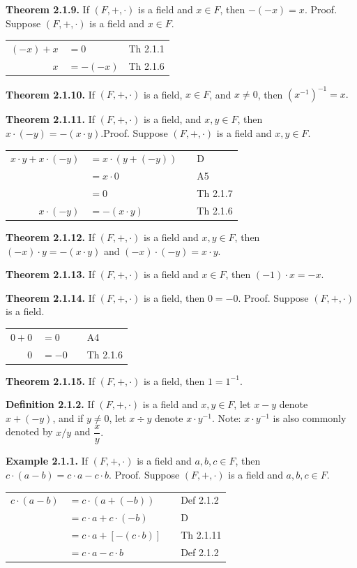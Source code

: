 \begin{large}
\textbf{Theorem 2.1.9.} If $(F,+,\cdot )$ is a field and $x \in F$, then $-(-x) = x$.\nl
 Proof. Suppose $(F,+,\cdot )$ is a field and $x \in F$.
\begin{tabular}{r l l}
$(-x) + x$& $= 0$ & Th 2.1.1 \\
$x$& $= -(-x)$ & Th 2.1.6 \\
\end{tabular} \nl

\textbf{Theorem 2.1.10.} If $(F,+,\cdot)$ is a field, $x \in F$, and $x \neq 0$, then $(x^{-1})^{-1} = x.$ \nl

\textbf{Theorem 2.1.11.} If $(F,+,\cdot )$ is a field, and $x,y \in F$, then $x\cdot (-y) = -(x\cdot y).$\nl Proof. Suppose $(F,+,\cdot )$ is a field and $x,y \in F.$\nl
\begin{tabular}{r l l l}
$x\cdot y + x\cdot (-y)$&$=x\cdot (y + (-y))$&&D \\
&$=x\cdot 0$ &&A5\\
&$=0$ &&Th 2.1.7 \\
$x\cdot (-y)$&$=-(x\cdot y)$ &&Th 2.1.6
\end{tabular}\nl


\textbf{Theorem 2.1.12.} If $(F,+,\cdot )$ is a field and $x,y \in F$, then $(-x)\cdot y = -(x\cdot y)$ and $(-x)\cdot (-y) = x\cdot y.$

\newpage

\textbf{Theorem 2.1.13.} If $(F,+,\cdot )$ is a field and $x \in F$, then $(-1)\cdot x = -x.$\nl

\textbf{Theorem 2.1.14.} If $(F,+,\cdot )$ is a field, then $0 = -0.$\nl
Proof. Suppose $(F,+,\cdot)$ is a field.

\begin{tabular}{r l l l}
$0 + 0$&$= 0$ &&A4\\
$0$ &$=-0$&& Th 2.1.6\\
\end{tabular}

\textbf{Theorem 2.1.15.} If $(F,+,\cdot)$ is a field, then $1 = 1^{-1}.$\nl

\textbf{Definition 2.1.2.} If $(F,+,\cdot )$ is a field and $x,y \in F$, let $x - y$ denote $x + (-y)$, and if $y \neq 0$, let $x\div y$ denote $x\cdot y^{-1}.$\nl
Note: $x\cdot y^{-1}$ is also commonly denoted by $x/y$ and $\dfrac{x}{y}.$\nl

\textbf{Example 2.1.1.} If $(F,+,\cdot)$ is a field and $a,b,c\in F$, then $c\cdot(a-b)=c\cdot a - c\cdot b.$\nl
Proof. Suppose $(F,+,\cdot)$ is a field and $a,b,c \in F$.
\begin{tabular}{r l l l}
$c\cdot (a-b)$ &$=c\cdot (a+(-b))$ &&Def 2.1.2 \\
&$=c\cdot a + c\cdot (-b)$&& D \\
&$=c\cdot a + [-(c\cdot b)]$ &&Th 2.1.11 \\
&$=c\cdot a - c\cdot b$ &&Def 2.1.2 \\
\end{tabular}\nl



\end{large}
